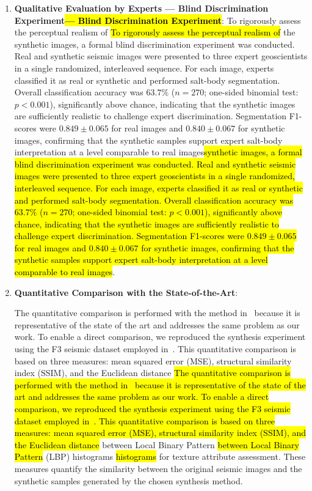 \documentclass{ieeeaccess}
\makeatletter
\DeclareRobustCommand{\DIFaddbegin}{\DIFOaddbegin \let\includegraphics\DIFaddincludegraphics} %
\DeclareRobustCommand{\DIFaddend}{\DIFOaddend \let\includegraphics\DIFOincludegraphics} %
\DeclareRobustCommand{\DIFdelbegin}{\DIFOdelbegin \let\includegraphics\DIFdelincludegraphics} %
\DeclareRobustCommand{\DIFdelend}{\DIFOaddend \let\includegraphics\DIFOincludegraphics} %
\let\sout@orig\sout %
\renewcommand{\sout}[1]{\ifmmode\text{\sout@orig{\ensuremath{#1}}}\else\sout@orig{#1}\fi} %
\providecommand{\DIFadd}[1]{{\protect\color{blue}#1}}
\providecommand{\DIFdel}[1]{{\protect\color{red}\sout{#1}}}
\renewcommand{\DIFadd}[1]{\ifmmode#1\else\begingroup\let\protect\relax\hl{#1}\endgroup\fi}
\renewcommand{\DIFdel}[1]{}
\providecommand{\DIFaddbegin}{}
\providecommand{\DIFaddend}{}
\providecommand{\DIFdelbegin}{}
\providecommand{\DIFdelend}{}
\renewcommand{\DIFaddbegin}{}
\renewcommand{\DIFaddend}{}
\renewcommand{\DIFdelbegin}{}
\renewcommand{\DIFdelend}{}
\makeatother
\begin{document}
\begin{enumerate}
    \item \textbf{Qualitative Evaluation by Experts \DIFaddbegin \DIFadd{— Blind Discrimination Experiment}\DIFaddend }: \DIFdelbegin \DIFdel{Experts try to identify the portions of salt dome structures inside the seismic samples, and each expert produces a mask label that will be compared with the mask generated by our proposed method. Quantitative measures, such as }\DIFdelend \DIFaddbegin \DIFadd{To rigorously assess the perceptual realism of }\DIFaddend the \DIFdelbegin \DIFdel{F1 score, are used to evaluate the difference between the experts predictions and the proposed method synthesized masks}\DIFdelend \DIFaddbegin \DIFadd{synthetic images, a formal blind discrimination experiment was conducted. Real and synthetic seismic images were presented to three expert geoscientists in a single randomized, interleaved sequence. For each image, experts classified it as real or synthetic and performed salt-body segmentation. Overall classification accuracy was $63.7\%$ ($n = 270$; one-sided binomial test: $p < 0.001$), significantly above chance, indicating that the synthetic images are sufficiently realistic to challenge expert discrimination. Segmentation F1-scores were $0.849 \pm 0.065$ for real images and $0.840 \pm 0.067$ for synthetic images, confirming that the synthetic samples support expert salt-body interpretation at a level comparable to real images}\DIFaddend .

    \item \textbf{Quantitative Comparison with the State-of-the-Art}:

    \DIFaddbegin \DIFadd{The quantitative comparison is performed with the method in~\cite{Ferreira2020} because it is representative of the state of the art and addresses the same problem as our work. To enable a direct comparison, we reproduced the synthesis experiment using the F3 seismic dataset employed in~\cite{Ferreira2020}. This quantitative comparison is based on three measures: mean squared error (MSE), structural similarity index (SSIM), and the Euclidean distance }\DIFaddend \DIFdelbegin \DIFdel{, using Local Binary Patterns }\DIFdelend \DIFaddbegin \DIFadd{between Local Binary Pattern }\DIFaddend (LBP) \DIFaddbegin \DIFadd{histograms }\DIFaddend for texture attribute assessment. These measures quantify the similarity between the original seismic images and the synthetic samples generated by the chosen synthesis method.



\end{enumerate}
\end{document}
